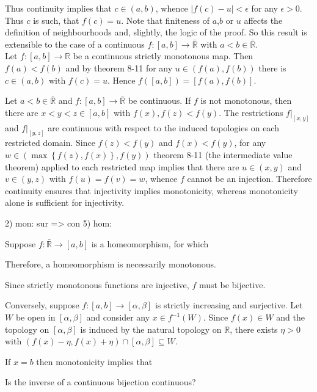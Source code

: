 \documentclass[a4paper]{article}
\newcommand{\obj}[1]{\left\{ #1 \right \}}
\newcommand{\clo}[1]{\left [ #1 \right ]}
\newcommand{\brac}[1]{\left ( #1 \right )}
\newcommand{\induc}[1]{\left . #1 \right \vert}
\newcommand{\abs}[1]{\left | #1 \right |}
\newcommand{\Rbar}{{\bar{\mathbb{R}}}}
\newcommand{\Real}{\mathbb{R}}
\begin{document}
Thus continuity implies that $c\in\brac{a,b}$, whence $\abs{f\brac{c}-u}<\epsilon$ for any $\epsilon>0$. Thus $c$ is such, that $f\brac{c}=u$. Note that finiteness of $a$,$b$ or $u$ affects the definition of neighbourhoods and, slightly, the logic of the proof. So this result is extensible to the case of a continuous $f:\clo{a,b}\to \Rbar$ with $a<b\in \Rbar$.\\

Let $f:\clo{a,b}\to\Real$ be a continuous strictly monotonous map. Then $f\brac{a}<f\brac{b}$ and by theorem 8-11 for any $u \in \brac{f\brac{a}, f\brac{b}}$ there is $c\in \brac{a,b}$ with $f\brac{c}=u$. Hence $f\brac{\clo{a,b}}=\clo{f\brac{a},f\brac{b}}$.

Let $a<b\in \Rbar$ and $f:\clo{a,b}\to\Rbar$ be continuous. If $f$ is not monotonous, then there are $x<y<z\in \clo{a,b}$ with $f\brac{x}, f\brac{z} < f\brac{y}$. The restrictions $\induc{f}_{\clo{x,y}}$ and $\induc{f}_{\clo{y,z}}$ are continuous with respect to the induced topologies on each restricted domain. Since $f\brac{z}<f\brac{y}$ and $f\brac{x}<f\brac{y}$, for any $w\in \brac{ \max\obj{ f\brac{z}, f\brac{x} }, f\brac{y} }$ theorem 8-11 (the intermediate value theorem) applied to each restricted map implies that there are $u\in \brac{x,y}$ and $v\in \brac{y,z}$ with $f\brac{u}=f\brac{v}=w$, whence $f$ cannot be an injection. Therefore continuity ensures that injectivity implies monotonicity, whereas monotonicity alone is sufficient for injectivity.


2) mon: sur => con
5) hom:

Suppose $f:\Rbar\to\clo{a,b}$ is a homeomorphism, for which 


 Therefore, a homeomorphism is necessarily monotonous.

Since strictly monotonous functions are injective, $f$ must be bijective.


Conversely, suppose $f:\clo{a,b}\to\clo{\alpha, \beta}$ is strictly increasing and surjective. Let $W$ be open in $\clo{\alpha, \beta}$ and consider any $x\in f^{-1}\brac{W}$. Since $f\brac{x}\in W$ and the topology on $\clo{\alpha, \beta}$ is induced by the natural topology on $\Real$, there exists $\eta>0$ with $\brac{f\brac{x}-\eta,f\brac{x}+\eta}\cap \clo{\alpha,\beta} \subseteq W$.

If $x=b$ then monotonicity implies that 



Is the inverse of a continuous bijection continuous?\\
\end{document}
